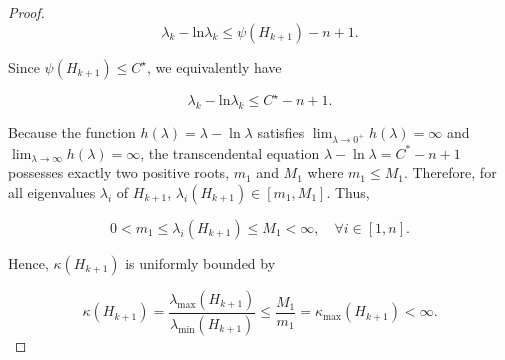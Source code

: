 \documentclass[10pt,a4paper]{amsart}
\begin{document}
\begin{proof}
\begin{equation}
\lambda_k - \text{ln}\lambda_k \leq \psi(H_{k+1}) - n + 1.
\end{equation}

\noindent
Since $\psi(H_{k+1}) \leq C^\star$, we equivalently have

\begin{equation}
\lambda_k - \text{ln}\lambda_k \leq C^\star - n + 1.
\end{equation}

\noindent
Because the function $h(\lambda) = \lambda - \ln\lambda$ satisfies $\lim_{\lambda \to 0^+} h(\lambda) = \infty$ and $\lim_{\lambda \to \infty} h(\lambda) = \infty$, the transcendental equation $\lambda - \ln\lambda = C^* - n + 1$ possesses exactly two positive roots, $m_1$ and $M_1$ where $m_1 \leq M_1$. Therefore, for all eigenvalues $\lambda_i$ of $H_{k+1}$, $\lambda_i(H_{k+1}) \in [m_1, M_1]$. Thus,

\begin{equation}
0 < m_1 \leq \lambda_i(H_{k+1}) \leq M_1 < \infty, \quad \forall i \in [1,n].
\end{equation}

\noindent
Hence, $\kappa(H_{k+1})$ is uniformly bounded by

\begin{equation}
\kappa(H_{k+1}) = \frac{\lambda_{\text{max}}(H_{k+1})}{\lambda_{\text{min}}(H_{k+1})} \leq \frac{M_1}{m_1} = \kappa_{\text{max}}(H_{k+1}) < \infty.
\end{equation}
\end{proof}
\end{document}
